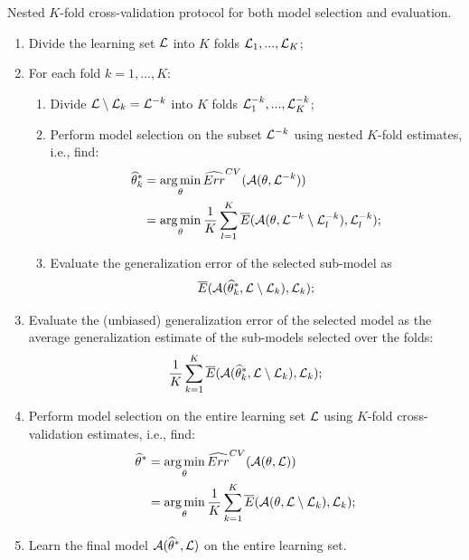 \begin{algorithm}\label{algo:cv}
Nested $K$-fold cross-validation protocol for both model selection and evaluation.

\begin{enumerate}
\item Divide the learning set ${\cal L}$ into $K$ folds ${\cal L}_1, ..., {\cal L}_K$;
\item For each fold $k=1, ..., K$:
    \begin{enumerate}
        \item Divide ${\cal L}\setminus{\cal L}_k = {\cal L}^{-k}$ into $K$ folds ${\cal L}_1^{-k}, ..., {\cal L}_K^{-k}$;
        \item Perform model selection on the subset ${\cal L}^{-k}$ using nested $K$-fold estimates, i.e., find:
        \begin{align}
            \widehat{\theta}_k^* &= \operatorname*{arg\,min}_{\theta} \widehat{Err}^{CV}({\cal A}(\theta, {\cal L}^{-k}))\\
                                 &= \operatorname*{arg\,min}_{\theta} \frac{1}{K} \sum_{l=1}^K \overline{E}({\cal A}(\theta, {\cal L}^{-k} \setminus {\cal L}_l^{-k}), {\cal L}_l^{-k});
        \end{align}
        \item Evaluate the generalization error of the selected sub-model as
        \begin{equation}
            \overline{E}({\cal A}(\widehat{\theta}^*_k, {\cal L}\setminus{\cal L}_k), {\cal L}_k);
        \end{equation}
    \end{enumerate}
\item Evaluate the (unbiased) generalization error of the selected model as the average generalization estimate of the sub-models selected over the folds:
\begin{equation}
\frac{1}{K} \sum_{k=1}^K \overline{E}({\cal A}(\widehat{\theta}^*_k, {\cal L}\setminus{\cal L}_k), {\cal L}_k);
\end{equation}
\item Perform model selection on the entire learning set ${\cal L}$ using $K$-fold cross-validation estimates, i.e., find:
\begin{align}
    \widehat{\theta}^* &= \operatorname*{arg\,min}_{\theta} \widehat{Err}^{CV}({\cal A}(\theta, {\cal L}))\\
                       &= \operatorname*{arg\,min}_{\theta} \frac{1}{K} \sum_{k=1}^K \overline{E}({\cal A}(\theta, {\cal L} \setminus {\cal L}_k), {\cal L}_k);
\end{align}
\item Learn the final model ${\cal A}(\widehat{\theta}^*, {\cal L})$ on the entire learning set.
\end{enumerate}
\end{algorithm}


